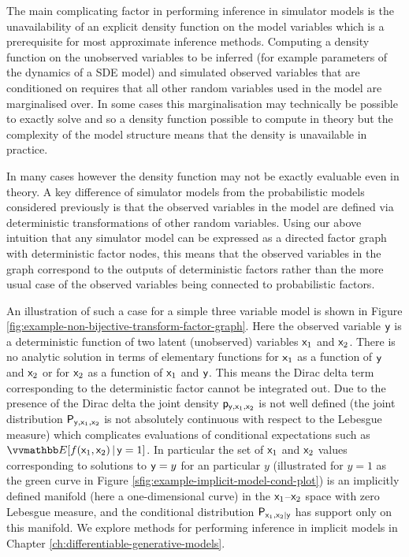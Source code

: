 The main complicating factor in performing inference in simulator models is the unavailability of an explicit density function on the model variables which is a prerequisite for most approximate inference methods. Computing a density function on the unobserved variables to be inferred (for example parameters of the dynamics of a \ac{SDE} model) and simulated observed variables that are conditioned on requires that all other random variables used in the model are marginalised over. In some cases this marginalisation may technically be possible to exactly solve and so a density function possible to compute in theory but the complexity of the model structure means that the density is unavailable in practice. 

In many cases however the density function may not be exactly evaluable even in theory. A key difference of simulator models from the probabilistic models considered previously is that the observed variables in the model are defined via deterministic transformations of other random variables. Using our above intuition that any simulator model can be expressed as a directed factor graph with deterministic factor nodes, this means that the observed variables in the graph correspond to the outputs of deterministic factors rather than the more usual case of the observed variables being connected to probabilistic factors.

An illustration of such a case for a simple three variable model is shown in Figure \ref{fig:example-non-bijective-transform-factor-graph}. Here the observed variable $\mathsf{y}$ is a deterministic function of two latent (unobserved) variables $\mathsf{x}_1$ and $\mathsf{x}_2$. There is no analytic solution in terms of elementary functions for $\mathsf{x}_1$ as a function of $\mathsf{y}$ and $\mathsf{x}_2$ or for $\mathsf{x}_2$ as a function of $\mathsf{x}_1$ and $\mathsf{y}$. This means the Dirac delta term corresponding to the deterministic factor cannot be integrated out. Due to the presence of the Dirac delta the joint density $\mathsf{p}_{\mathsf{y},\mathsf{x}_1,\mathsf{x}_2}$ is not well defined (the joint distribution $\mathsf{P}_{\mathsf{y},\mathsf{x}_1,\mathsf{x}_2}$ is not absolutely continuous with respect to the Lebesgue measure) which complicates evaluations of conditional expectations such as $\expc{f(\rvar{x}_1,\rvar{x}_2) \gvn \rvar{y} = 1}$. In particular the set of $\mathsf{x}_1$ and $\mathsf{x}_2$ values corresponding to solutions to $\mathsf{y} = y$ for an particular $y$ (illustrated for $y=1$ as the green curve in Figure \ref{sfig:example-implicit-model-cond-plot}) is an implicitly defined manifold (here a one-dimensional curve) in the $\mathsf{x}_1$--$\mathsf{x}_2$ space with zero Lebesgue measure, and the conditional distribution $\mathsf{P}_{\mathsf{x}_1,\mathsf{x}_2|\mathsf{y}}$ has support only on this manifold.  %
We explore methods for performing inference in implicit models in Chapter \ref{ch:differentiable-generative-models}.

